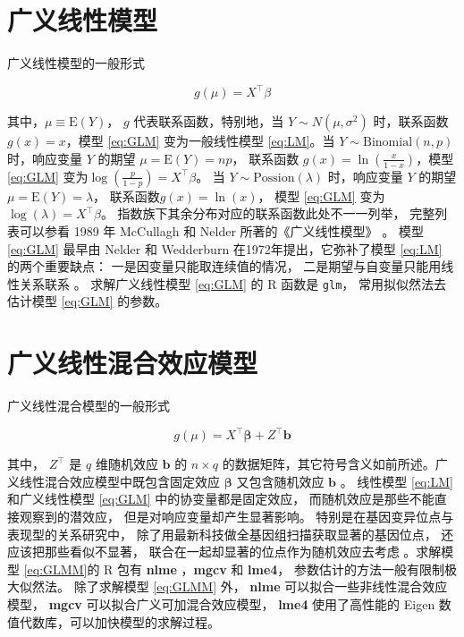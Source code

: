 \documentclass[12pt,a4paper,UTF8,twoside]{book}
\theoremstyle{definition}
\theoremstyle{definition}
\theoremstyle{definition}
\theoremstyle{remark}
\begin{document}
\hypertarget{Generalized-Linear-Models}{%
\section{广义线性模型}\label{Generalized-Linear-Models}}

广义线性模型的一般形式

\begin{equation}
g(\mu) = X^{\top}\beta  \label{eq:GLM}
\end{equation}

\noindent 其中，\(\mu \equiv \mathrm{E}(Y)\)， \(g\)
代表联系函数，特别地，当 \(Y \sim N(\mu,\sigma^2)\) 时，联系函数
\(g(x) = x\)，模型 \eqref{eq:GLM} 变为一般线性模型 \eqref{eq:LM}。当
\(Y \sim \mathrm{Binomial}(n,p)\) 时，响应变量 \(Y\) 的期望
\(\mu =\mathrm{E}(Y) = np\)， 联系函数 \(g(x)=\ln(\frac{x}{1-x})\)，模型
\eqref{eq:GLM} 变为\(\log(\frac{p}{1-p})=X^{\top}\beta\)。 当
\(Y \sim \mathrm{Possion}(\lambda)\) 时，响应变量 \(Y\) 的期望
\(\mu =\mathrm{E}(Y) = \lambda\)， 联系函数\(g(x) = \ln(x)\)， 模型
\eqref{eq:GLM} 变为 \(\log(\lambda) = X^{\top}\beta\)。
指数族下其余分布对应的联系函数此处不一一列举， 完整列表可以参看 1989 年
McCullagh 和 Nelder 所著的《广义线性模型》 \citep{McCullagh1989}。 模型
\eqref{eq:GLM} 最早由 Nelder 和 Wedderburn
在1972年提出\citep{Nelder1972}，它弥补了模型 \eqref{eq:LM}
的两个重要缺点： 一是因变量只能取连续值的情况，
二是期望与自变量只能用线性关系联系 \citep{Chen2011}。 求解广义线性模型
\eqref{eq:GLM} 的 R 函数是 \texttt{glm}， 常用拟似然法去估计模型
\eqref{eq:GLM} 的参数。

\hypertarget{Generalized-Linear-Mixed-Effects-Models}{%
\section{广义线性混合效应模型}\label{Generalized-Linear-Mixed-Effects-Models}}

广义线性混合模型的一般形式

\begin{equation}
g(\mu) = X^{\top}\boldsymbol{\beta} + Z^{\top}\mathbf{b}  \label{eq:GLMM}
\end{equation}

\noindent 其中， \(Z^{\top}\) 是 \(q\) 维随机效应 \(\mathbf{b}\) 的
\(n \times q\)
的数据矩阵，其它符号含义如前所述。广义线性混合效应模型中既包含固定效应
\(\boldsymbol{\beta}\) 又包含随机效应 \(\mathbf{b}\) 。 线性模型
\eqref{eq:LM} 和广义线性模型 \eqref{eq:GLM} 中的协变量都是固定效应，
而随机效应是那些不能直接观察到的潜效应， 但是对响应变量却产生显著影响。
特别是在基因变异位点与表现型的关系研究中，
除了用最新科技做全基因组扫描获取显著的基因位点，
还应该把那些看似不显著， 联合在一起却显著的位点作为随机效应去考虑
\citep{Yang2010Common}。求解模型 \eqref{eq:GLMM}的 R 包有 \textbf{nlme}
，\textbf{mgcv} 和 \textbf{lme4}， 参数估计的方法一般有限制极大似然法。
除了求解模型 \eqref{eq:GLMM} 外， \textbf{nlme}
可以拟合一些非线性混合效应模型， \textbf{mgcv}
可以拟合广义可加混合效应模型， \textbf{lme4} 使用了高性能的 Eigen
数值代数库，可以加快模型的求解过程。
\end{document}
